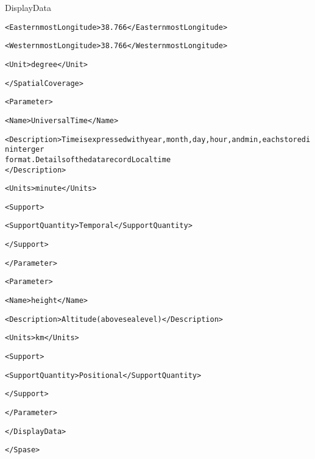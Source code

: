 \begin{itembox}[1]{DisplayData}
{\begin{alltt}
      <EasternmostLongitude>38.766</EasternmostLongitude>
  		
      <WesternmostLongitude>38.766</WesternmostLongitude>
  		
      <Unit>degree</Unit>
  	
    </SpatialCoverage>
  	
  	
    <Parameter>
  		
      <Name>Universal Time</Name>
  		
      <Description>Time is expressed with year, month, day, hour, and min, each stored in interger 
                   format. Details of the data record Local time
		</Description>
  		
      <Units>minute</Units>
  		
      <Support>
  			
        <SupportQuantity>Temporal</SupportQuantity>
  		
      </Support>
  		
  	
    </Parameter>
  	
    <Parameter>
  		
      <Name>height</Name>
  		
      <Description>Altitude (above sea level)</Description>
  		
      <Units>km</Units>
  		
      <Support>
  			
        <SupportQuantity>Positional</SupportQuantity>
  		
      </Support>
  		
  	
    </Parameter>

  
  </DisplayData>
  

</Spase>

\end{alltt}
}
\end{itembox}

\newpage

